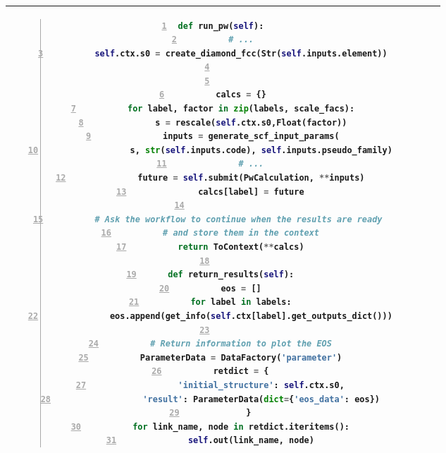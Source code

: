 \begin{table}
\begin{tabular}{|c|c|}
{\begin{lstlisting}[language=Python,numbers=left,moredelim={[is][\color{gray}]{??}{??}}]
    def run_pw(self):
        # ...
        self.ctx.s0 = create_diamond_fcc(Str(self.inputs.element))


        calcs = {}
        for label, factor in zip(labels, scale_facs):
            s = rescale(self.ctx.s0,Float(factor))
            inputs = generate_scf_input_params(
                s, str(self.inputs.code), self.inputs.pseudo_family)
            # ...
            future = self.submit(PwCalculation, **inputs)
            calcs[label] = future
          
        # Ask the workflow to continue when the results are ready 
        # and store them in the context
        return ToContext(**calcs)

    def return_results(self):
        eos = []
        for label in labels:
            eos.append(get_info(self.ctx[label].get_outputs_dict()))

        # Return information to plot the EOS
        ParameterData = DataFactory('parameter')
        retdict = {
                'initial_structure': self.ctx.s0,
                'result': ParameterData(dict={'eos_data': eos})
           }
        for link_name, node in retdict.iteritems():
            self.out(link_name, node)

\end{lstlisting}
}
\\
\hline
\end{tabular}
\end{table}


